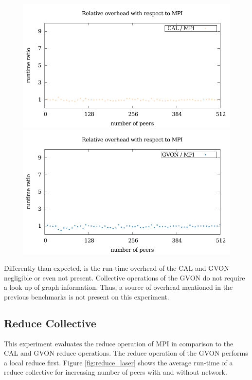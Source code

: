 \begin{figure}[H]
\begin{minipage}[t]{0.5\textwidth}
  \end{minipage}%
  \begin{minipage}[t]{0.5\textwidth}
    \includegraphics[width=\textwidth]{plots/50_collective_network_overhead_cal_laser}
    \includegraphics[width=\textwidth]{plots/50_collective_network_overhead_gvon_laser}
  \end{minipage}%
  \caption{ }
  \label{fig:gather_laser}
\end{figure}

\noindent Differently than expected, is the run-time overhead of the CAL and GVON
negligible or even not present. Collective operations of the GVON
do not require a look up of graph information. Thus, a source of
overhead mentioned in the previous benchmarks is not present on
this experiment.

\subsection*{Reduce Collective}
This experiment evaluates the reduce operation of MPI in comparison to
the CAL and GVON reduce operations.  The reduce operation of the GVON
performs a local reduce first.  Figure \ref{fig:reduce_laser} shows
the average run-time of a reduce collective for increasing number of
peers with and without network.

